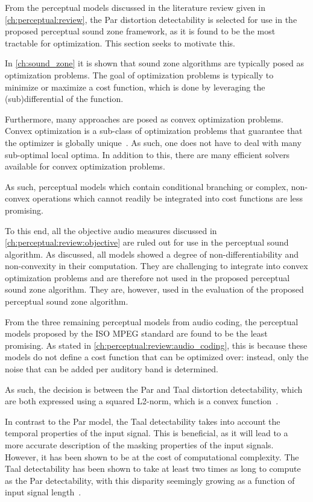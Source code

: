From the perceptual models discussed in the literature review given in \autoref{ch:perceptual:review}, the Par distortion detectability is selected for use in the proposed perceptual sound zone framework, as it 
is found to be the most tractable for optimization.
This section seeks to motivate this.

In \autoref{ch:sound_zone} it is shown that sound zone algorithms are typically posed as optimization problems. 
The goal of optimization problems is typically to minimize or maximize a cost function, which is done by leveraging the (sub)differential of the function.

Furthermore, many approaches are posed as convex optimization problems.
Convex optimization is a sub-class of optimization problems that guarantee that the optimizer is globally unique~\cite{boyd2004convex}. 
As such, one does not have to deal with many sub-optimal local optima. 
In addition to this, there are many efficient solvers available for convex optimization problems.

As such, perceptual models which contain conditional branching or complex, non-convex operations which cannot readily 
be integrated into cost functions are less promising.

To this end, all the objective audio measures discussed in \autoref{ch:perceptual:review:objective} 
are ruled out for use in the perceptual sound algorithm. 
As discussed, all models showed a degree of non-differentiability and non-convexity in their computation.
They are challenging to integrate into convex optimization problems and are therefore not used in the proposed perceptual sound zone algorithm.
They are, however, used in the evaluation of the proposed perceptual sound zone algorithm.

From the three remaining perceptual models from audio coding, 
the perceptual models proposed by the ISO MPEG standard are found to be the least promising.
As stated in \autoref{ch:perceptual:review:audio_coding}, this is because these models do not define a cost function that can be optimized over: instead, only the noise that can be added per auditory band is determined.

As such, the decision is between the Par and Taal distortion detectability, which are both expressed using a  squared L2-norm, which is a convex function~\cite{boyd2004convex}.

In contrast to the Par model, the Taal detectability takes into account the temporal properties of the input signal.
This is beneficial, as it will lead to a more accurate description of the masking properties of the input signals.
However, it has been shown to be at the cost of computational complexity.
The Taal detectability has been shown to take at least two times as long to compute as the Par detectability, with this disparity seemingly growing as a function of input signal length~\cite{taal2012low}.


